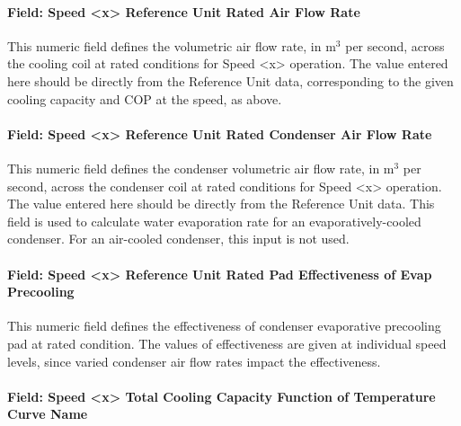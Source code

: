 \paragraph{Field: Speed \textless{}x\textgreater{} Reference Unit Rated Air Flow Rate}\label{field-speed-x-reference-unit-rated-air-flow-rate}

This numeric field defines the volumetric air flow rate, in m\(^{3}\) per second, across the cooling coil at rated conditions for Speed \textless{}x\textgreater{} operation. The value entered here should be directly from the Reference Unit data, corresponding to the given cooling capacity and COP at the speed, as above.

\paragraph{Field: Speed \textless{}x\textgreater{} Reference Unit Rated Condenser Air Flow Rate}\label{field-speed-x-reference-unit-rated-condenser-air-flow-rate}

This numeric field defines the condenser volumetric air flow rate, in m\(^{3}\) per second, across the condenser coil at rated conditions for Speed \textless{}x\textgreater{} operation. The value entered here should be directly from the Reference Unit data. This field is used to calculate water evaporation rate for an evaporatively-cooled condenser. For an air-cooled condenser, this input is not used.

\paragraph{Field: Speed \textless{}x\textgreater{} Reference Unit Rated Pad Effectiveness of Evap Precooling}\label{field-speed-x-reference-unit-rated-pad-effectiveness-of-evap-precooling}

This numeric field defines the effectiveness of condenser evaporative precooling pad at rated condition. The values of effectiveness are given at individual speed levels, since varied condenser air flow rates impact the effectiveness.

\paragraph{Field: Speed \textless{}x\textgreater{} Total Cooling Capacity Function of Temperature Curve Name}\label{field-speed-x-total-cooling-capacity-function-of-temperature-curve-name-1}

